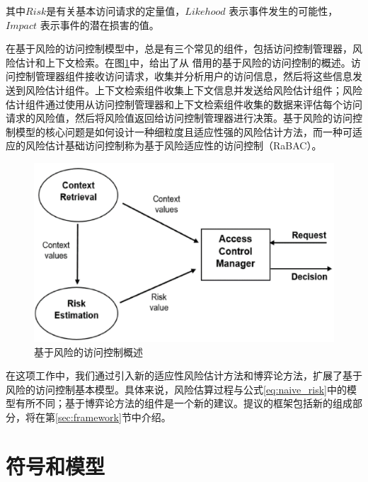 其中$Risk$是有关基本访问请求的定量值，$Likehood$ 表示事件发生的可能性，$Impact$ 表示事件的潜在损害的值。


在基于风险的访问控制模型中，总是有三个常见的组件，包括访问控制管理器，风险估计和上下文检索。在图\ref{fig:rbac}中，给出了从 \cite{diep2007}借用的基于风险的访问控制的概述。访问控制管理器组件接收访问请求，收集并分析用户的访问信息，然后将这些信息发送到风险估计组件。上下文检索组件收集上下文信息并发送给风险估计组件；风险估计组件通过使用从访问控制管理器和上下文检索组件收集的数据来评估每个访问请求的风险值，然后将风险值返回给访问控制管理器进行决策。基于风险的访问控制模型的核心问题是如何设计一种细粒度且适应性强的风险估计方法，而一种可适应的风险估计基础访问控制称为基于风险适应性的访问控制（RaBAC）。
\begin{figure}[htb]
	\centering
	\includegraphics[width=.85\textwidth]{./figures/fig-rbac.jpg}
	\caption{基于风险的访问控制概述\cite{diep2007}}\label{fig:rbac}
\end{figure}

在这项工作中，我们通过引入新的适应性风险估计方法和博弈论方法，扩展了基于风险的访问控制基本模型。具体来说，风险估算过程与公式\ref{eq:naive_risk}中的模型有所不同；基于博弈论方法的组件是一个新的建议。提议的框架包括新的组成部分，将在第\ref{sec:framework}节中介绍。


\section{符号和模型}
\label{sec:notations}


